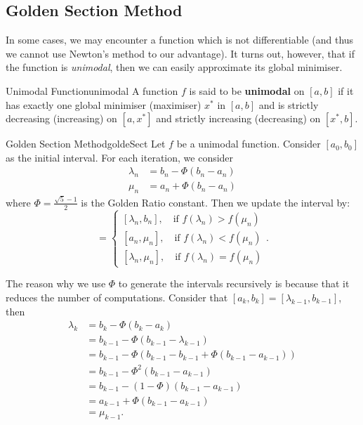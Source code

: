 \documentclass[math, code]{amznotes}
\theoremstyle{remark}
\begin{document}
\subsection{Golden Section Method}
In some cases, we may encounter a function which is not differentiable (and thus we cannot use Newton's method to our advantage). It turns out, however, that if the function is \textit{unimodal}, then we can easily approximate its global minimiser.
\begin{dfnbox}{Unimodal Function}{unimodal}
    A function $f$ is said to be {\color{red} \textbf{unimodal}} on $[a, b]$ if it has exactly one global minimiser (maximiser) $x^*$ in $[a, b]$ and is strictly decreasing (increasing) on $[a, x^*]$ and strictly increasing (decreasing) on $[x^*, b]$.
\end{dfnbox}
\begin{tecbox}{Golden Section Method}{goldeSect}
    Let $f$ be a unimodal function. Consider $[a_0, b_0]$ as the initial interval. For each iteration, we consider
    \begin{align*}
        \lambda_n & = b_n - \Phi(b_n - a_n) \\
        \mu_n & = a_n + \Phi(b_n - a_n)
    \end{align*}
    where $\Phi = \frac{\sqrt{5} - 1}{2}$ is the Golden Ratio constant. Then we update the interval by:
    \begin{equation*}
        [a_{n + 1}, b_{n + 1}] = \begin{cases}
            [\lambda_n, b_n], \quad \textrm{if } f(\lambda_n) > f(\mu_n)\\
            [a_n, \mu_n], \quad \textrm{if } f(\lambda_n) < f(\mu_n)\\
            [\lambda_n, \mu_n], \quad \textrm{if } f(\lambda_n) = f(\mu_n)
        \end{cases}.
    \end{equation*}
\end{tecbox}
The reason why we use $\Phi$ to generate the intervals recursively is because that it reduces the number of computations. Consider that $[a_k, b_k] = [\lambda_{k - 1}, b_{k - 1}]$, then
\begin{align*}
    \lambda_k & = b_k - \Phi(b_k - a_k) \\
    & = b_{k - 1} - \Phi(b_{k - 1} - \lambda_{k - 1}) \\
    & = b_{k - 1} - \Phi(b_{k - 1} - b_{k - 1} + \Phi(b_{k - 1} - a_{k - 1})) \\
    & = b_{k - 1} - \Phi^2(b_{k - 1} - a_{k - 1}) \\
    & = b_{k - 1} - (1 - \Phi)(b_{k - 1} - a_{k - 1}) \\
    & = a_{k - 1} + \Phi(b_{k - 1} - a_{k - 1}) \\
    & = \mu_{k - 1}.
\end{align*}
\end{document}
